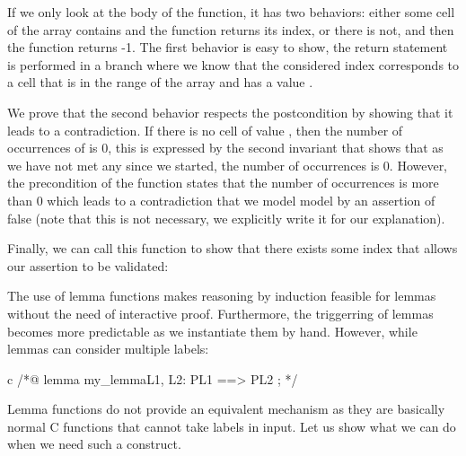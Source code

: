 


If we only look at the body of the function, it has two behaviors: either some
cell of the array contains  and the function returns its index, or
there is not, and then the function returns -1. The first behavior is easy to
show, the return statement is performed in a branch where we know that the
considered index corresponds to a cell that is in the range of the array and has
a value .



We prove that the second behavior respects the postcondition by showing that it
leads to a contradiction. If there is no cell of value , then
the number of occurrences of  is 0, this is expressed by the
second invariant that shows that as we have not met any  since we
started, the number of occurrences is 0. However, the precondition of the
function states that the number of occurrences is more than $0$ which leads to
a contradiction that we model model by an assertion of false (note that this is
not necessary, we explicitly write it for our explanation).



Finally, we can call this function to show that there exists some index that
allows our assertion to be validated:






The use of lemma functions makes reasoning by induction feasible for lemmas
without the need of interactive proof. Furthermore, the triggerring of lemmas
becomes more predictable as we instantiate them by hand. However, while lemmas
can consider multiple labels:



\begin{CodeBlock}{c}
/*@
  lemma my_lemma{L1, L2}:  P{L1} ==> P{L2} ;
*/
\end{CodeBlock}



Lemma functions do not provide an equivalent mechanism as they are basically
normal C functions that cannot take labels in input. Let us show what we can
do when we need such a construct.






